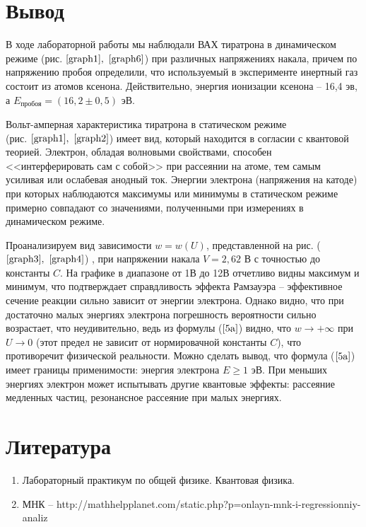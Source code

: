 \documentclass[a4paper, 12pt]{article}%
\begin{document}
\newpage

\section{Вывод}

В ходе лабораторной работы мы наблюдали ВАХ тиратрона в динамическом режиме (рис.$~\ref{graph1},~\ref{graph6}$) при различных напряжениях накала, причем по напряжению пробоя определили, что используемый в эксперименте инертный газ состоит из атомов ксенона. Действительно, энергия ионизации ксенона -- 16,4 эв, а $E_\text{пробоя} = (16,2 \pm 0,5)$ эВ. 
	
	Вольт-амперная характеристика тиратрона в статическом режиме \\
(рис. $\ref{graph1},~\ref{graph2}$) имеет вид, который находится в согласии с квантовой теорией. Электрон, обладая волновыми свойствами, способен <<интерферировать сам с собой>> при рассеянии на атоме, тем самым усиливая или ослабевая анодный ток. Энергии электрона (напряжения на катоде) при которых наблюдаются максимумы или минимумы в статическом режиме примерно совпадают со значениями, полученными при измерениях в динамическом режиме.
	
	Проанализируем вид зависимости $w = w(U)$, представленной на рис. ($\ref{graph3},~\ref{graph4}$) , при напряжении накала $V = 2,62$ В с точностью до константы $C$. На графике в диапазоне от 1В до 12В отчетливо видны максимум и минимум, что подтверждает справдливость эффекта Рамзауэра -- эффективное сечение реакции сильно зависит от энергии электрона. Однако видно, что при достаточно малых энергиях электрона погрешность вероятности сильно возрастает, что неудивительно, ведь из формулы ($\ref{5a}$) видно, что $w\rightarrow +\infty$ при $U\rightarrow0$ (этот предел не зависит от нормировачной константы $C$), что противоречит физической реальности. Можно сделать вывод, что формула ($\ref{5a}$) имеет границы применимости: энергия электрона $E \geq 1$ эВ. При меньших энергиях электрон может испытывать другие квантовые эффекты: рассеяние медленных частиц, резонансное рассеяние при малых энергиях.



\section{Литература}

\begin{enumerate}

\item Лабораторный практикум по общей физике. Квантовая физика.

\item МНК -- http://mathhelpplanet.com/static.php?p=onlayn-mnk-i-regressionniy-analiz

\end{enumerate}	
\end{document}
